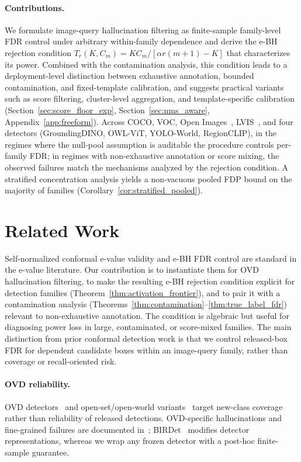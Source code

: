 \documentclass{article}
\theoremstyle{remark}
\newcommand{\1}{\mathbf{1}}
\begin{document}
\paragraph{Contributions.}
We formulate image-query hallucination filtering as finite-sample
family-level FDR control under arbitrary within-family dependence
and derive the e-BH rejection condition
$T_r(K,C_m)=K C_m/[\alpha r(m{+}1){-}K]$ that characterizes its
power. Combined with the contamination analysis, this condition
leads to a deployment-level distinction between exhaustive
annotation, bounded contamination, and fixed-template calibration,
and suggests practical variants such as score filtering,
cluster-level aggregation, and template-specific calibration
(Section~\ref{sec:score_floor_exp},
Section~\ref{sec:nms_aware}, Appendix~\ref{app:freeform}).
Across COCO, VOC, Open
Images~\cite{kuznetsova2020open}, LVIS~\cite{gupta2019lvis}, and
four detectors (GroundingDINO, OWL-ViT, YOLO-World, RegionCLIP),
in the regimes where the null-pool assumption is auditable the
procedure controls per-family FDR; in regimes with non-exhaustive
annotation or score mixing, the observed failures match the
mechanisms analyzed by the rejection condition. A stratified concentration analysis yields
a non-vacuous pooled FDP bound on the majority of families
(Corollary~\ref{cor:stratified_pooled}).

\section{Related Work}
\label{sec:related}

Self-normalized conformal e-value validity and e-BH FDR control
are standard in the e-value literature. Our contribution is to
instantiate them for OVD hallucination filtering, to make the
resulting e-BH rejection condition explicit for detection families
(Theorem~\ref{thm:activation_frontier}), and to pair it with a
contamination analysis
(Theorems~\ref{thm:contamination}--\ref{thm:true_label_fdr})
relevant to non-exhaustive annotation. The condition is algebraic
but useful for diagnosing power loss in large, contaminated, or
score-mixed families. The main distinction from prior conformal
detection work is that we control released-box FDR for dependent
candidate boxes within an image-query family, rather than coverage
or recall-oriented risk.

\paragraph{OVD reliability.}
OVD detectors~\cite{gu2021open,zhong2022regionclip,li2022grounded,zhou2022detecting,du2022learning,kuo2022f,wu2023cora,yao2023detclipv2,zhang2023simple,wang2023open,li2024learning,zhao2024taming,kim2024region,cho2024language}
and open-set/open-world
variants~\cite{joseph2021towards,han2022expanding,sarkar2024open,yin2025rod,xi2025ow,zhang2025open,yang2025detecting}
target new-class coverage rather than reliability of released detections.
OVD-specific hallucinations and fine-grained failures are documented
in~\cite{ruis2026fantastic,bianchi2024devil};
BIRDet~\cite{zeng2024boosting} modifies detector representations,
whereas we wrap any frozen detector with a post-hoc finite-sample
guarantee.
\end{document}
